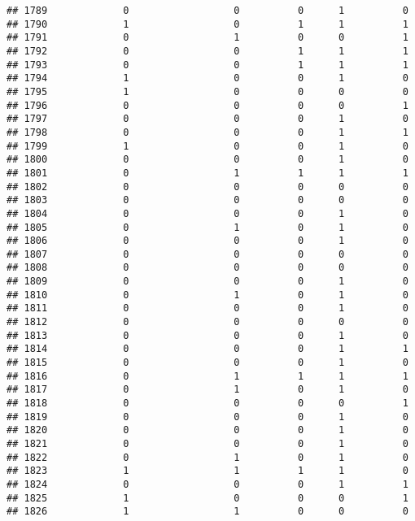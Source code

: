 \documentclass[
]{article}
\begin{document}
\begin{verbatim}
## 1789             0                  0          0      1          0
## 1790             1                  0          1      1          1
## 1791             0                  1          0      0          1
## 1792             0                  0          1      1          1
## 1793             0                  0          1      1          1
## 1794             1                  0          0      1          0
## 1795             1                  0          0      0          0
## 1796             0                  0          0      0          1
## 1797             0                  0          0      1          0
## 1798             0                  0          0      1          1
## 1799             1                  0          0      1          0
## 1800             0                  0          0      1          0
## 1801             0                  1          1      1          1
## 1802             0                  0          0      0          0
## 1803             0                  0          0      0          0
## 1804             0                  0          0      1          0
## 1805             0                  1          0      1          0
## 1806             0                  0          0      1          0
## 1807             0                  0          0      0          0
## 1808             0                  0          0      0          0
## 1809             0                  0          0      1          0
## 1810             0                  1          0      1          0
## 1811             0                  0          0      1          0
## 1812             0                  0          0      0          0
## 1813             0                  0          0      1          0
## 1814             0                  0          0      1          1
## 1815             0                  0          0      1          0
## 1816             0                  1          1      1          1
## 1817             0                  1          0      1          0
## 1818             0                  0          0      0          1
## 1819             0                  0          0      1          0
## 1820             0                  0          0      1          0
## 1821             0                  0          0      1          0
## 1822             0                  1          0      1          0
## 1823             1                  1          1      1          0
## 1824             0                  0          0      1          1
## 1825             1                  0          0      0          1
## 1826             1                  1          0      0          0

\end{verbatim}
\end{document}
